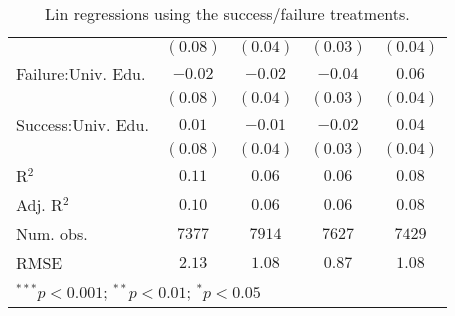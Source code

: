 \begin{table}[H]
\begin{center}
\begin{footnotesize}
\begin{tabular}{l c c c c}
                   & $(0.08)$     & $(0.04)$     & $(0.03)$     & $(0.04)$     \\
Failure:Univ. Edu. & $-0.02$      & $-0.02$      & $-0.04$      & $0.06$       \\
                   & $(0.08)$     & $(0.04)$     & $(0.03)$     & $(0.04)$     \\
Success:Univ. Edu. & $0.01$       & $-0.01$      & $-0.02$      & $0.04$       \\
                   & $(0.08)$     & $(0.04)$     & $(0.03)$     & $(0.04)$     \\
\hline
R$^2$              & $0.11$       & $0.06$       & $0.06$       & $0.08$       \\
Adj. R$^2$         & $0.10$       & $0.06$       & $0.06$       & $0.08$       \\
Num. obs.          & $7377$       & $7914$       & $7627$       & $7429$       \\
RMSE               & $2.13$       & $1.08$       & $0.87$       & $1.08$       \\
\hline
\multicolumn{5}{l}{\tiny{$^{***}p<0.001$; $^{**}p<0.01$; $^{*}p<0.05$}}
\end{tabular}
\end{footnotesize}
\caption{Lin regressions using the success/failure treatments.}
\label{tab:success_lin}
\end{center}
\end{table}
